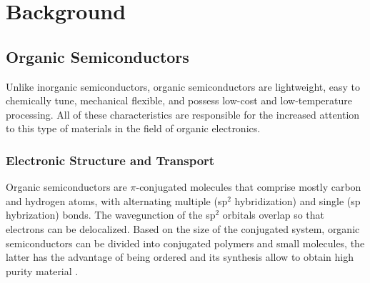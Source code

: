 \chapter{Background} \label{chap:background}

\section{Organic Semiconductors}

Unlike inorganic semiconductors, organic semiconductors are lightweight, easy to chemically tune, mechanical flexible, and possess low-cost and low-temperature processing. All of these characteristics are responsible for the increased attention to this type of materials in the field of organic electronics. 


\subsection{Electronic Structure and Transport} 

Organic semiconductors are $\pi$-conjugated molecules that comprise mostly carbon and hydrogen atoms, with alternating multiple (sp$^{2}$ hybridization) and single (sp hybrization) bonds. The wavegunction of the sp$^{2}$ orbitals overlap so that electrons can be delocalized.
Based on the size of the conjugated system, organic semiconductors can be divided into conjugated polymers and small molecules, the latter has the advantage of being ordered and its synthesis allow to obtain high purity material \cite{alcacerElectronicStructureOrganic2018}.

